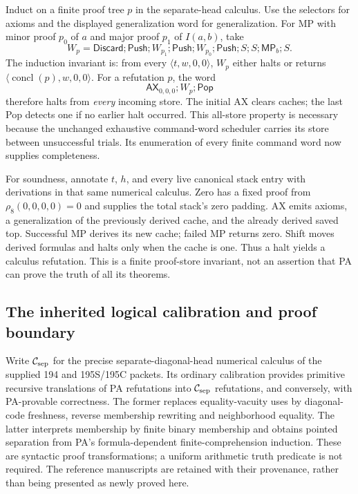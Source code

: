 Induct on a finite proof tree $p$ in the separate-head calculus.
Use the selectors for axioms and the displayed generalization word for
generalization. For MP with minor proof $p_0$ of $a$ and major proof
$p_1$ of $I(a,b)$, take
\[
 W_p=\mathsf{Discard};\mathsf{Push};W_{p_1};\mathsf{Push};
            W_{p_0};\mathsf{Push};S;S;\mathsf{MP}_b;S.
\]
The induction invariant is: from every $\langle t,w,0,0\rangle$,
$W_p$ either halts or returns
$\langle\operatorname{concl}(p),w,0,0\rangle$.
For a refutation $p$, the word
\[
                  \mathsf{AX}_{0,0,0};W_p;\mathsf{Pop}
\]
therefore halts from \emph{every} incoming store. The initial AX clears
caches; the last Pop detects one if no earlier halt occurred. This
all-store property is necessary because the unchanged exhaustive
command-word scheduler carries its store between unsuccessful trials.
Its enumeration of every finite command word now supplies completeness.

For soundness, annotate $t$, $h$, and every live canonical stack entry
with derivations in that same numerical calculus. Zero has a fixed proof
from $\rho_8(0,0,0,0)=0$ and supplies the total stack's zero padding.
AX emits axioms, a generalization of the previously derived cache,
and the already derived saved top. Successful MP derives its new cache;
failed MP returns zero. Shift moves derived formulas and halts only when
the cache is one. Thus a halt yields a calculus refutation. This is a
finite proof-store invariant, not an assertion that PA can prove the
truth of all its theorems.

\subsection{The inherited logical calibration and proof boundary}

Write $\mathcal C_{\rm sep}$ for the precise separate-diagonal-head
numerical calculus of the supplied 194 and 195S/195C packets. Its ordinary
calibration provides primitive recursive translations of PA refutations
into $\mathcal C_{\rm sep}$ refutations, and conversely, with PA-provable
correctness. The former replaces equality-vacuity uses by diagonal-code
freshness, reverse membership rewriting and neighborhood equality. The
latter interprets membership by finite binary membership and obtains
pointed separation from PA's formula-dependent finite-comprehension
induction. These are syntactic proof transformations; a uniform arithmetic
truth predicate is not required. The reference manuscripts are retained
with their provenance, rather than being presented as newly proved here.

